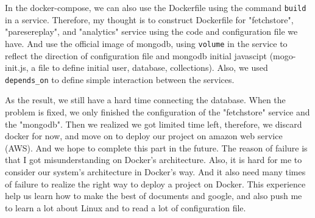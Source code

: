 \documentclass{article}
\newcommand{\codeinline}[1]{
    \texttt{#1}
}
\begin{document}
\begin{enumerate}
    In the docker-compose, we can also use the Dockerfile using the command \codeinline{build} in a service. Therefore, my thought is to construct Dockerfile for "fetchstore", "paresereplay", and "analytics" service using the code and configuration file we have. And use the official image of mongodb, using \codeinline{volume} in the service to reflect the direction of configuration file and mongodb initial javascipt (mogo-init.js, a file to define initial user, database, collections). Also, we used \codeinline{depends_on} to define simple interaction between the services.\\
\end{enumerate}
As the result, we still have a hard time connecting the database. When the problem is fixed, we only finished the configuration of the "fetchstore" service and the "mongodb". Then we realized we got limited time left, therefore, we discard docker for now, and move on to deploy our project on amazon web service (AWS). And we hope to complete this part in the future.
The reason of failure is that I got misunderstanding on Docker's architecture. Also, it is hard for me to consider our system's architecture in Docker's way. And it also need many times of failure to realize the right way to deploy a project on Docker. This experience help us learn how to make the best of documents and google, and also push me to learn a lot about Linux and to read a lot of configuration file.
\end{document}
